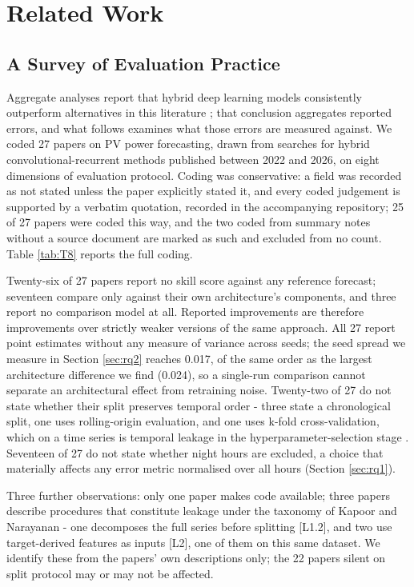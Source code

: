 \section{Related Work}
\label{sec:related}

\subsection{A Survey of Evaluation Practice}
\label{sec:related-survey}

Aggregate analyses report that hybrid deep learning models
consistently outperform alternatives in this literature
\cite{nguyenmusgens2021drives}; that conclusion aggregates reported
errors, and what follows examines what those errors are measured
against. We coded 27 papers on PV power forecasting, drawn from
searches for hybrid convolutional-recurrent methods published between
2022 and 2026, on eight dimensions of evaluation protocol. Coding was
conservative: a field was recorded as not stated unless the paper
explicitly stated it, and every coded judgement is supported by a
verbatim quotation, recorded in the accompanying repository; 25 of 27
papers were coded this way, and the two coded from summary notes
without a source document are marked as such and excluded from no
count. Table \ref{tab:T8} reports the full coding.



Twenty-six of 27 papers report no skill score against any reference
forecast; seventeen compare only against their own architecture's
components, and three report no comparison model at all. Reported
improvements are therefore improvements over strictly weaker versions
of the same approach. All 27 report point estimates without any
measure of variance across seeds; the seed spread we measure in Section
\ref{sec:rq2} reaches 0.017, of the same order as the largest
architecture difference we find (0.024), so a single-run comparison
cannot separate an architectural effect from retraining noise.
Twenty-two of 27 do not state whether their split preserves temporal
order - three state a chronological split, one uses rolling-origin
evaluation, and one uses k-fold cross-validation, which on a time
series is temporal leakage in the hyperparameter-selection stage
\cite{kapoor2023leakage, hewamalage2023pitfalls}. Seventeen of 27 do
not state whether night hours are excluded, a choice that materially
affects any error metric normalised over all hours (Section
\ref{sec:rq1}).

Three further observations: only one paper makes code available; three
papers describe procedures that constitute leakage under the taxonomy
of Kapoor and Narayanan \cite{kapoor2023leakage} - one decomposes the
full series before splitting [L1.2], and two use target-derived
features as inputs [L2], one of them on this same dataset. We identify
these from the papers' own descriptions only; the 22 papers silent on
split protocol may or may not be affected.

